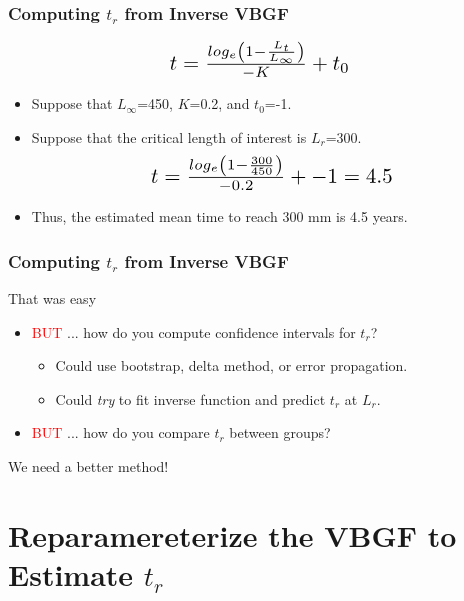 \documentclass[xcolor=dvipsnames]{beamer}\usepackage[]{graphicx}\usepackage[]{color}
\newcommand*{\Scale}[2][4]{\scalebox{#1}{\ensuremath{#2}}}%
\begin{document}
\begin{frame}[fragile, t]
\frametitle{Computing $t_{r}$ from Inverse VBGF}
\[\Scale[1.5]{ t = \frac{log_{e}\left(1-\frac{L_{t}}{L_{\infty}}\right)}{-K} + t_{0} }\]
  \smallskip
\begin{itemize}
  \item Suppose that $L_{\infty}$=450, $K$=0.2, and $t_{0}$=-1.
  \item Suppose that the critical length of interest is $L_{r}$=300.
  \pause
  \smallskip
\[\Scale[1.5]{ t = \frac{log_{e}\left(1-\frac{300}{450}\right)}{-0.2} + -1 = 4.5}\]
  \pause
  \smallskip
  \item Thus, the estimated mean time to reach 300 mm is 4.5 years.
\end{itemize}
\end{frame}


\begin{frame}[fragile, t]
\frametitle{Computing $t_{r}$ from Inverse VBGF}
\begin{center}
{\LARGE That was easy}
\end{center}
\pause
\vspace{0.25in}
\begin{itemize}
  \item \textcolor{red}{BUT} ... how do you compute confidence intervals for $t_{r}$?
  \pause
  \begin{itemize}
    \item Could use bootstrap, delta method, or error propagation.
    \item Could \emph{try} to fit inverse function and predict $t_{r}$ at $L_{r}$.
  \end{itemize}
  \pause
  \bigskip
  \item \textcolor{red}{BUT} ... how do you compare $t_{r}$ between groups?
\end{itemize}
\pause
\vspace{0.5in}
\begin{center}
{\LARGE We need a better method!}
\end{center}
\end{frame}



\section{Reparamereterize the VBGF to Estimate $t_{r}$}
\end{document}
